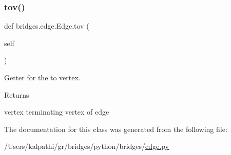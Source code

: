 \subsubsection{\texorpdfstring{tov()}{tov()}}
{\footnotesize\ttfamily def bridges.\+edge.\+Edge.\+tov (\begin{DoxyParamCaption}\item[{}]{self }\end{DoxyParamCaption})}



Getter for the to vertex. 

\begin{DoxyReturn}{Returns}


vertex terminating vertex of edge 
\end{DoxyReturn}


The documentation for this class was generated from the following file\+:\begin{DoxyCompactItemize}
\item 
/\+Users/kalpathi/gr/bridges/python/bridges/\mbox{\hyperlink{edge_8py}{edge.\+py}}\end{DoxyCompactItemize}
